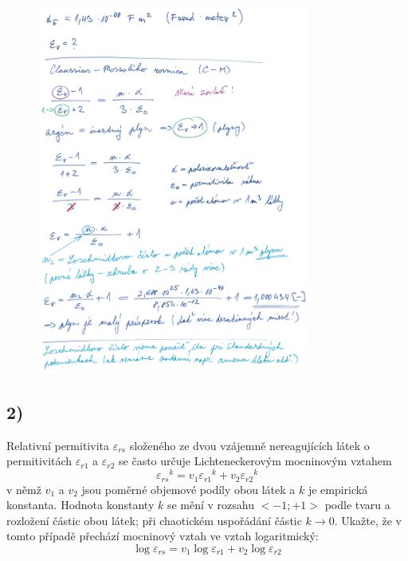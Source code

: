 \begin{figure}[h]
    \centering
    \includegraphics*[width=0.80\textwidth]{images/diel1.jpg}
\end{figure}

\newpage


\subsection*{2)}
Relativní permitivita $\varepsilon_{rs}$ složeného ze dvou vzájemně nereagujících látek o permitivitách $\varepsilon_{r1}$ a $\varepsilon_{r2}$ se často určuje Lichteneckerovým mocninovým vztahem
\begin{equation}
    {{\varepsilon_{rs}}^k}={v_1{\varepsilon_{r1}}^k}+{v_2{\varepsilon_{r2}}^k}
\end{equation}
v němž $v_1$ a $v_2$ jsou poměrné objemové podíly obou látek a $k$ je empirická konstanta. Hodnota konstanty $k$ se mění v rozsahu $<-1; +1>$ podle tvaru a rozložení částic obou látek; při chaotickém uspořádání částic $k\rightarrow 0$. Ukažte, že v tomto případě přechází mocninový vztah ve vztah logaritmický:
\begin{equation}
    {\log{\varepsilon_{rs}}}={v_1\log{\varepsilon_{r1}}}+{v_2\log{\varepsilon_{r2}}}
\end{equation}

